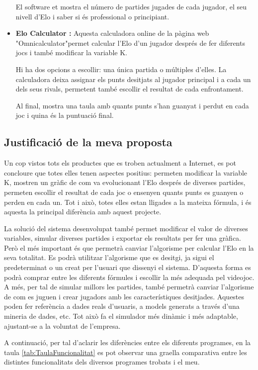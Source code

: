 \documentclass[a4paper]{article}
\begin{document}
\begin{itemize}
    El software et mostra el número de partides jugades de cada jugador, el seu nivell d'Elo i saber si és professional o principiant. 
    
    \item \textbf{Elo Calculator \cite{EloSystemOmnicalculator}:} Aquesta calculadora online de la pàgina web "Omnicalculator"\space permet calcular l'Elo d'un jugador després de fer diferents jocs i també modificar la variable K. 
    
    Hi ha dos opcions a escollir: una única partida o múltiples d'elles. La calculadora deixa assignar els punts desitjats al jugador principal i a cada un dels seus rivals, permetent també escollir el resultat de cada enfrontament.
    
    Al final, mostra una taula amb quants punts s'han guanyat i perdut en cada joc i quina és la puntuació final.
\end{itemize}

\subsection{Justificació de la meva proposta}
Un cop vistos tots els productes que es troben actualment a Internet, es pot concloure que totes elles tenen aspectes positius: permeten modificar la variable K,  mostren un gràfic de com va evolucionant l'Elo després de diverses partides,  permeten escollir el resultat de cada joc o ensenyen quants punts es guanyen o perden en cada un. Tot i això, totes elles estan lligades a la mateixa fórmula, i és aquesta la principal diferència amb aquest projecte.

La solució del sistema desenvolupat també permet modificar el valor de diverses variables, simular diverses partides i exportar els resultats per fer una gràfica. Però el més important és que permetrà canviar l'algorisme per calcular l'Elo en la seva totalitat. Es podrà utilitzar l'algorisme que es desitgi, ja sigui el predeterminat o un creat per l'usuari que dissenyi el sistema. D'aquesta forma es podrà comprar entre les diferents fórmules i escollir la més adequada pel videojoc. A més, per tal de simular millors les partides, també permetrà canviar l'algorisme de com es juguen i crear jugadors amb les característiques desitjades. Aquestes poden fer referència a dades reals d'usuaris, a models generats a través d'una mineria de dades, etc. Tot això fa el simulador més dinàmic i més adaptable, ajustant-se a la voluntat de l'empresa.

A continuació, per tal d'aclarir les diferències entre els diferents programes, en la taula \ref{tab:TaulaFuncionalitat} es pot observar una graella comparativa entre les distintes funcionalitats dels diversos programes trobats i el meu.
\end{document}
